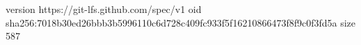 version https://git-lfs.github.com/spec/v1
oid sha256:7018b30ed26bbb3b5996110c6d728c409fc933f5f16210866473f8f9c0f3fd5a
size 587
